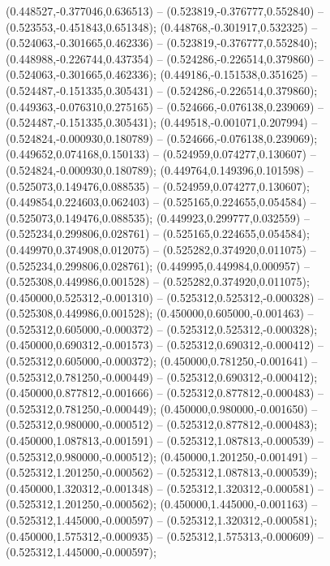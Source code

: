 (0.448527,-0.377046,0.636513) -- (0.523819,-0.376777,0.552840) -- (0.523553,-0.451843,0.651348);
 (0.448768,-0.301917,0.532325) -- (0.524063,-0.301665,0.462336) -- (0.523819,-0.376777,0.552840);
 (0.448988,-0.226744,0.437354) -- (0.524286,-0.226514,0.379860) -- (0.524063,-0.301665,0.462336);
 (0.449186,-0.151538,0.351625) -- (0.524487,-0.151335,0.305431) -- (0.524286,-0.226514,0.379860);
 (0.449363,-0.076310,0.275165) -- (0.524666,-0.076138,0.239069) -- (0.524487,-0.151335,0.305431);
 (0.449518,-0.001071,0.207994) -- (0.524824,-0.000930,0.180789) -- (0.524666,-0.076138,0.239069);
 (0.449652,0.074168,0.150133) -- (0.524959,0.074277,0.130607) -- (0.524824,-0.000930,0.180789);
 (0.449764,0.149396,0.101598) -- (0.525073,0.149476,0.088535) -- (0.524959,0.074277,0.130607);
 (0.449854,0.224603,0.062403) -- (0.525165,0.224655,0.054584) -- (0.525073,0.149476,0.088535);
 (0.449923,0.299777,0.032559) -- (0.525234,0.299806,0.028761) -- (0.525165,0.224655,0.054584);
 (0.449970,0.374908,0.012075) -- (0.525282,0.374920,0.011075) -- (0.525234,0.299806,0.028761);
 (0.449995,0.449984,0.000957) -- (0.525308,0.449986,0.001528) -- (0.525282,0.374920,0.011075);
 (0.450000,0.525312,-0.001310) -- (0.525312,0.525312,-0.000328) -- (0.525308,0.449986,0.001528);
 (0.450000,0.605000,-0.001463) -- (0.525312,0.605000,-0.000372) -- (0.525312,0.525312,-0.000328);
 (0.450000,0.690312,-0.001573) -- (0.525312,0.690312,-0.000412) -- (0.525312,0.605000,-0.000372);
 (0.450000,0.781250,-0.001641) -- (0.525312,0.781250,-0.000449) -- (0.525312,0.690312,-0.000412);
 (0.450000,0.877812,-0.001666) -- (0.525312,0.877812,-0.000483) -- (0.525312,0.781250,-0.000449);
 (0.450000,0.980000,-0.001650) -- (0.525312,0.980000,-0.000512) -- (0.525312,0.877812,-0.000483);
 (0.450000,1.087813,-0.001591) -- (0.525312,1.087813,-0.000539) -- (0.525312,0.980000,-0.000512);
 (0.450000,1.201250,-0.001491) -- (0.525312,1.201250,-0.000562) -- (0.525312,1.087813,-0.000539);
 (0.450000,1.320312,-0.001348) -- (0.525312,1.320312,-0.000581) -- (0.525312,1.201250,-0.000562);
 (0.450000,1.445000,-0.001163) -- (0.525312,1.445000,-0.000597) -- (0.525312,1.320312,-0.000581);
 (0.450000,1.575312,-0.000935) -- (0.525312,1.575313,-0.000609) -- (0.525312,1.445000,-0.000597);
